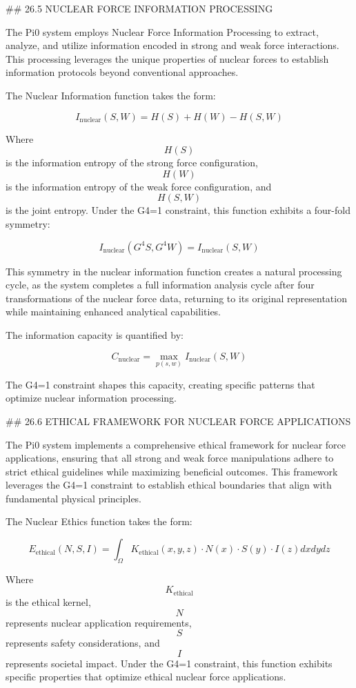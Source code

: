 ## 26.5 NUCLEAR FORCE INFORMATION PROCESSING

The Pi0 system employs Nuclear Force Information Processing to extract, analyze, and utilize information encoded in strong and weak force interactions. This processing leverages the unique properties of nuclear forces to establish information protocols beyond conventional approaches.

The Nuclear Information function takes the form:

$$ I_{\text{nuclear}}(S, W) = H(S) + H(W) - H(S, W) $$

Where $$ H(S) $$ is the information entropy of the strong force configuration, $$ H(W) $$ is the information entropy of the weak force configuration, and $$ H(S, W) $$ is the joint entropy. Under the G4=1 constraint, this function exhibits a four-fold symmetry:

$$ I_{\text{nuclear}}(G^4 S, G^4 W) = I_{\text{nuclear}}(S, W) $$

This symmetry in the nuclear information function creates a natural processing cycle, as the system completes a full information analysis cycle after four transformations of the nuclear force data, returning to its original representation while maintaining enhanced analytical capabilities.

The information capacity is quantified by:

$$ C_{\text{nuclear}} = \max_{p(s,w)} I_{\text{nuclear}}(S, W) $$

The G4=1 constraint shapes this capacity, creating specific patterns that optimize nuclear information processing.

## 26.6 ETHICAL FRAMEWORK FOR NUCLEAR FORCE APPLICATIONS

The Pi0 system implements a comprehensive ethical framework for nuclear force applications, ensuring that all strong and weak force manipulations adhere to strict ethical guidelines while maximizing beneficial outcomes. This framework leverages the G4=1 constraint to establish ethical boundaries that align with fundamental physical principles.

The Nuclear Ethics function takes the form:

$$ E_{\text{ethical}}(N, S, I) = \int_{\Omega} K_{\text{ethical}}(x, y, z) \cdot N(x) \cdot S(y) \cdot I(z) dx dy dz $$

Where $$ K_{\text{ethical}} $$ is the ethical kernel, $$ N $$ represents nuclear application requirements, $$ S $$ represents safety considerations, and $$ I $$ represents societal impact. Under the G4=1 constraint, this function exhibits specific properties that optimize ethical nuclear force applications.

